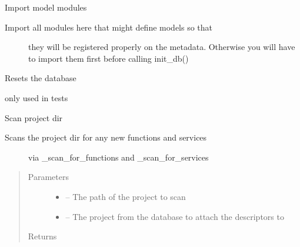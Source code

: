 \documentclass[letterpaper,10pt,english]{sphinxmanual}
\begin{document}
\begin{fulllineitems}
\label{_source/son_editor.app:son_editor.app.database.init_db}
Import model modules
\begin{description}
\item[{Import all modules here that might define models so that}] \leavevmode
they will be registered properly on the metadata.  Otherwise
you will have to import them first before calling init\_db()

\end{description}

\end{fulllineitems}


\begin{fulllineitems}
\label{_source/son_editor.app:son_editor.app.database.reset_db}
Resets the database

only used in tests

\end{fulllineitems}


\begin{fulllineitems}
\label{_source/son_editor.app:son_editor.app.database.scan_project_dir}
Scan project dir
\begin{description}
\item[{Scans the project dir for any new functions and services }] \leavevmode
via \_scan\_for\_functions and \_scan\_for\_services

\end{description}
\begin{quote}\begin{description}
\item[{Parameters}] \leavevmode\begin{itemize}
\item {} 
 -- The path of the project to scan

\item {} 
 -- The project from the database to attach the descriptors to

\end{itemize}

\item[{Returns}] \leavevmode


\end{description}\end{quote}

\end{fulllineitems}
\end{document}
